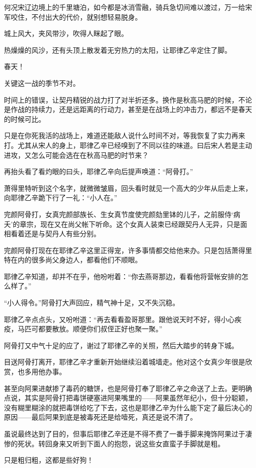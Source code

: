 何况宋辽边境上的千里塘泊，如今都是冰消雪融，骑兵急切间难以渡过，万一给宋军咬住，不付出大的代价，就别想轻易脱身。

城上风大，夹风带沙，吹得人眯起了眼。

热燥燥的风沙，还有头顶上散发着无穷热力的太阳，让耶律乙辛定住了脚。

春天！

关键这一战的季节不对。

时间上的错误，让契丹精锐的战力打了对半折还多。换作是秋高马肥的时候，不论是作战的持续力，还是远距离的行动力，甚至是在战场上的冲击力，都远不是春天的时候可比。

只是在你死我活的战场上，难道还能敌人说什么时间不对，等我恢复了实力再来打。尤其从宋人的身上，耶律乙辛已经嗅到了不同以往的味道。曰后宋人若是主动进攻，又怎么可能会选在在秋高马肥的时节来？

再抬头看了看灼眼的曰头，耶律乙辛向后提声唤道：“阿骨打。”

萧得里特听到这个名字，就微微皱眉，回头看时就见一个高大的少年从后走上来，向耶律乙辛跪下行了一礼：“小人在。”

完颜阿骨打，女真完颜部族长、生女真节度使完颜劾里钵的儿子，之前服侍‘病夭’的章宗，现在又在尚父帐下听命。这个女真人装束已经跟契丹人无异，只是面相看着还是与契丹人有些分别。

完颜阿骨打现在在耶律乙辛这里正得宠，许多事情都交给他来办。只是包括萧得里特在内的很多尚父身边人，都看他们不顺眼。

耶律乙辛知道，却并不在乎，他吩咐着：“你去燕哥那边，看看他将营帐安排的怎么样了。”

“小人得令。”阿骨打大声回应，精气神十足，又不失沉稳。

耶律乙辛点点头，又吩咐道：“再去看看盈哥那里。跟他说天时不好，得小心疾疫，马匹可都要散放。顺便你们叔侄正好也聚一聚。”

阿骨打又中气十足的应了，谢过了耶律乙辛的关照，然后大踏步的转身下城。

目送阿骨打离开，耶律乙辛才重新开始继续沿着城墙走。他对这个女真少年很是欣赏，也多用他办事。

甚至向阿果进献掺了毒药的糖饼，也是阿骨打奉了耶律乙辛之命送了上去。更明确点说，其实是阿骨打把毒饼硬塞进阿果嘴里的——阿果虽然年纪小，但十分聪颖，没有糊里糊涂的就把毒饼给吃了下去，这也是耶律乙辛为什么能下定了最后决心的原因——最后阿果到底是被毒死还是给噎死，真还是说不清了。

虽说最终达到了目的，但事后耶律乙辛还是不得不费了一番手脚来掩饰阿果过于凄惨的死状。转回身来又听到下面人的抱怨，说这些女直蛮子手脚就是粗。

只是粗归粗，这都是些好狗！

